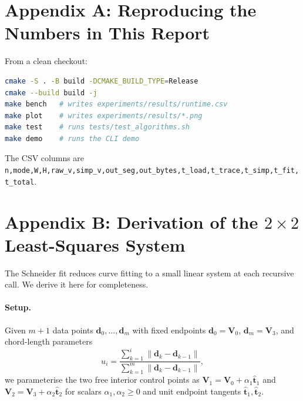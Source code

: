 \documentclass[twocolumn,a4paper,10pt]{article}
\begin{document}
\appendix
\section*{Appendix A: Reproducing the Numbers in This Report}
From a clean checkout:
\begin{lstlisting}[language=bash]
cmake -S . -B build -DCMAKE_BUILD_TYPE=Release
cmake --build build -j
make bench   # writes experiments/results/runtime.csv
make plot    # writes experiments/results/*.png
make test    # runs tests/test_algorithms.sh
make demo    # runs the CLI demo
\end{lstlisting}
The CSV columns are
\texttt{n,mode,W,H,raw\_v,simp\_v,out\_seg,out\_bytes,t\_load,t\_trace,t\_simp,t\_fit,t\_total}.

\section*{Appendix B: Derivation of the $2\times 2$ Least-Squares System}

The Schneider fit reduces curve fitting to a small linear system at
each recursive call.  We derive it here for completeness.

\paragraph*{Setup.}
Given $m{+}1$ data points $\mathbf{d}_0,\dots,\mathbf{d}_m$ with
fixed endpoints $\mathbf{d}_0=\mathbf{V}_0$,
$\mathbf{d}_m=\mathbf{V}_3$, and chord-length parameters
\[
u_i = \frac{\sum_{k=1}^{i}\|\mathbf{d}_k-\mathbf{d}_{k-1}\|}
           {\sum_{k=1}^{m}\|\mathbf{d}_k-\mathbf{d}_{k-1}\|},
\]
we parameterise the two free interior control points as
$\mathbf{V}_1 = \mathbf{V}_0 + \alpha_1\hat{\mathbf{t}}_1$ and
$\mathbf{V}_2 = \mathbf{V}_3 + \alpha_2\hat{\mathbf{t}}_2$
for scalars $\alpha_1,\alpha_2\ge 0$ and unit endpoint tangents
$\hat{\mathbf{t}}_1,\hat{\mathbf{t}}_2$.
\end{document}

